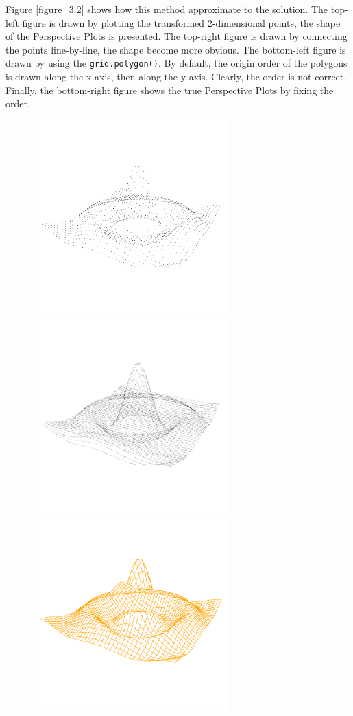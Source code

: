 \documentclass[11pt,twoside]{report}
\begin{document}
Figure \ref{figure_3.2} shows how this method approximate to the solution. The top-left figure is drawn by plotting the transformed 2-dimensional points, the shape of the Perspective Plots is presented. The top-right figure is drawn by connecting the points line-by-line, the shape become more obvious. The bottom-left figure is drawn by using the \texttt{grid.polygon()}. By default, the origin order of the polygons is drawn along the x-axis, then along the y-axis. Clearly, the order is not correct. Finally, the bottom-right figure shows the true Perspective Plots by fixing the order. 
\begin{figure}[h]
	\begin{center}
		\includegraphics[height = 7.5cm, width = 7.5cm]{figure/standalone_p_1.pdf}
		\includegraphics[height = 7.5cm, width = 7.5cm]{figure/standalone_p_2.pdf}
		\includegraphics[height = 7.5cm, width = 7.5cm]{figure/standalone_p_3.pdf}

\end{center}
\end{figure}
\end{document}
